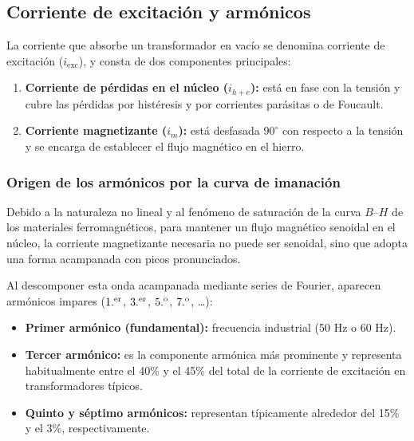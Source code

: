 \documentclass[12pt]{article}
\begin{document}
\subsection{Corriente de excitaci\'on y arm\'onicos}

La corriente que absorbe un transformador en vac\'io se denomina corriente de excitaci\'on ($i_{\mathrm{exc}}$), y consta de dos componentes principales:
\begin{enumerate}
    \item \textbf{Corriente de p\'erdidas en el n\'ucleo ($i_{h+e}$):} est\'a en fase con la tensi\'on y cubre las p\'erdidas por hist\'eresis y por corrientes par\'asitas o de Foucault.
    \item \textbf{Corriente magnetizante ($i_m$):} est\'a desfasada $90^\circ$ con respecto a la tensi\'on y se encarga de establecer el flujo magn\'etico en el hierro.
\end{enumerate}

\subsubsection{Origen de los arm\'onicos por la curva de imanaci\'on}

Debido a la naturaleza no lineal y al fen\'omeno de saturaci\'on de la curva $B$--$H$ de los materiales ferromagn\'eticos, para mantener un flujo magn\'etico senoidal en el n\'ucleo, la corriente magnetizante necesaria no puede ser senoidal, sino que adopta una forma acampanada con picos pronunciados.

Al descomponer esta onda acampanada mediante series de Fourier, aparecen arm\'onicos impares ($1.\textsuperscript{er}$, $3.\textsuperscript{er}$, $5.\textsuperscript{o}$, $7.\textsuperscript{o}$, \ldots):
\begin{itemize}
    \item \textbf{Primer arm\'onico (fundamental):} frecuencia industrial (50 Hz o 60 Hz).
    \item \textbf{Tercer arm\'onico:} es la componente arm\'onica m\'as prominente y representa habitualmente entre el 40\% y el 45\% del total de la corriente de excitaci\'on en transformadores t\'ipicos.
    \item \textbf{Quinto y s\'eptimo arm\'onicos:} representan t\'ipicamente alrededor del 15\% y el 3\%, respectivamente.
\end{itemize}
\end{document}
